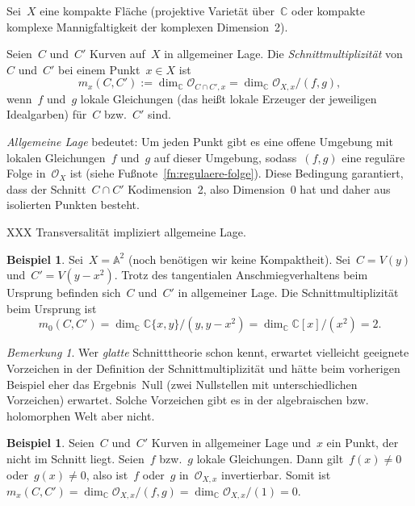 \documentclass[a4paper,ngerman,12pt]{scrartcl}
\theoremstyle{definition}
\newtheorem{ex}[defn]{Beispiel}
\theoremstyle{plain}
\theoremstyle{remark}
\newtheorem{rem}[defn]{Bemerkung}
\renewcommand{\AA}{\mathbb{A}}
\newcommand{\CC}{\mathbb{C}}
\renewcommand{\O}{\mathcal{O}}
\begin{document}
Sei~$X$ eine kompakte Fläche (projektive Varietät über~$\CC$ oder
kompakte komplexe Mannigfaltigkeit der komplexen Dimension~2).

\begin{defn}Seien~$C$ und~$C'$ Kurven auf~$X$ in allgemeiner Lage. Die
\emph{Schnittmultiplizität} von~$C$ und~$C'$ bei einem Punkt~$x \in X$ ist
\[ m_x(C,C') := \dim_\CC \O_{C \cap C',x} = \dim_\CC \O_{X,x}/(f,g), \]
wenn~$f$ und~$g$ lokale Gleichungen (das heißt lokale Erzeuger der jeweiligen
Idealgarben) für~$C$ bzw.~$C'$ sind.
\end{defn}

\emph{Allgemeine Lage} bedeutet: Um jeden Punkt gibt es eine offene Umgebung
mit lokalen Gleichungen~$f$ und~$g$ auf dieser Umgebung, sodass~$(f,g)$ eine
reguläre Folge in~$\O_X$ ist (siehe Fußnote~\ref{fn:regulaere-folge}). Diese
Bedingung garantiert, dass der Schnitt~$C \cap C'$ Kodimension~2, also
Dimension~0 hat und daher aus isolierten Punkten besteht.

XXX Transversalität impliziert allgemeine Lage.

\begin{ex}Sei~$X = \AA^2$ (noch benötigen wir keine Kompaktheit). Sei~$C = V(y)$
und~$C' = V(y-x^2)$. Trotz des tangentialen Anschmiegverhaltens beim Ursprung
befinden sich~$C$ und~$C'$ in allgemeiner Lage. Die Schnittmultiplizität beim
Ursprung ist
\[ m_0(C,C') = \dim_\CC \CC\{x,y\}/(y,y-x^2) = \dim_\CC \CC[x]/(x^2) =
2. \]\end{ex}

\begin{rem}Wer \emph{glatte} Schnitttheorie schon kennt, erwartet vielleicht geeignete
Vorzeichen in der Definition der Schnittmultiplizität und hätte beim vorherigen
Beispiel eher das Ergebnis~Null (zwei Nullstellen mit unterschiedlichen
Vorzeichen) erwartet. Solche Vorzeichen gibt es in der algebraischen bzw.
holomorphen Welt aber nicht.
\end{rem}

\begin{ex}Seien~$C$ und~$C'$ Kurven in allgemeiner Lage und~$x$ ein Punkt, der
nicht im Schnitt liegt. Seien~$f$ bzw.~$g$ lokale Gleichungen. Dann gilt~$f(x)
\neq 0$ oder~$g(x) \neq 0$, also ist~$f$ oder~$g$ in~$\O_{X,x}$ invertierbar.
Somit ist~$m_x(C,C') = \dim_\CC \O_{X,x}/(f,g) = \dim_\CC \O_{X,x}/(1) =
0$.\end{ex}
\end{document}
